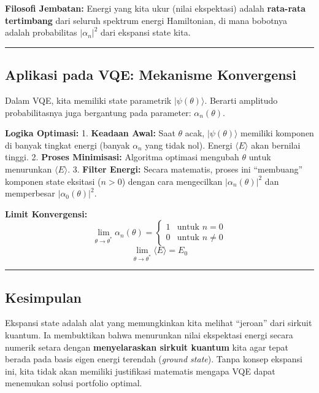\textbf{Filosofi Jembatan:} Energi yang kita ukur (nilai ekspektasi) adalah \textbf{rata-rata tertimbang} dari seluruh spektrum energi Hamiltonian, di mana bobotnya adalah probabilitas \(|\alpha_n|^2\) dari ekspansi state kita.

\begin{center}\rule{0.5\linewidth}{0.5pt}\end{center}

\hypertarget{aplikasi-pada-vqe-mekanisme-konvergensi}{%
\subsection{Aplikasi pada VQE: Mekanisme Konvergensi}\label{aplikasi-pada-vqe-mekanisme-konvergensi}}

Dalam VQE, kita memiliki state parametrik \(|\psi(\theta)\rangle\). Berarti amplitudo probabilitasnya juga bergantung pada parameter: \(\alpha_n(\theta)\).

\textbf{Logika Optimasi:} 1. \textbf{Keadaan Awal:} Saat \(\theta\) acak, \(|\psi(\theta)\rangle\) memiliki komponen di banyak tingkat energi (banyak \(\alpha_n\) yang tidak nol). Energi \(\langle E \rangle\) akan bernilai tinggi. 2. \textbf{Proses Minimisasi:} Algoritma optimasi mengubah \(\theta\) untuk menurunkan \(\langle E \rangle\). 3. \textbf{Filter Energi:} Secara matematis, proses ini ``membuang'' komponen state eksitasi (\(n > 0\)) dengan cara mengecilkan \(|\alpha_n(\theta)|^2\) dan memperbesar \(|\alpha_0(\theta)|^2\).

\textbf{Limit Konvergensi:} \[ \lim_{\theta \to \theta^*} \alpha_n(\theta) = \begin{cases} 1 & \text{untuk } n=0 \\ 0 & \text{untuk } n \ne 0 \end{cases} \] \[ \lim_{\theta \to \theta^*} \langle E \rangle = E_0 \]

\begin{center}\rule{0.5\linewidth}{0.5pt}\end{center}

\hypertarget{kesimpulan}{%
\subsection{Kesimpulan}\label{kesimpulan-g}}

Ekspansi state adalah alat yang memungkinkan kita melihat ``jeroan'' dari sirkuit kuantum. Ia membuktikan bahwa menurunkan nilai ekspektasi energi secara numerik setara dengan \textbf{menyelaraskan sirkuit kuantum} kita agar tepat berada pada basis eigen energi terendah (\emph{ground state}). Tanpa konsep ekspansi ini, kita tidak akan memiliki justifikasi matematis mengapa VQE dapat menemukan solusi portfolio optimal.
